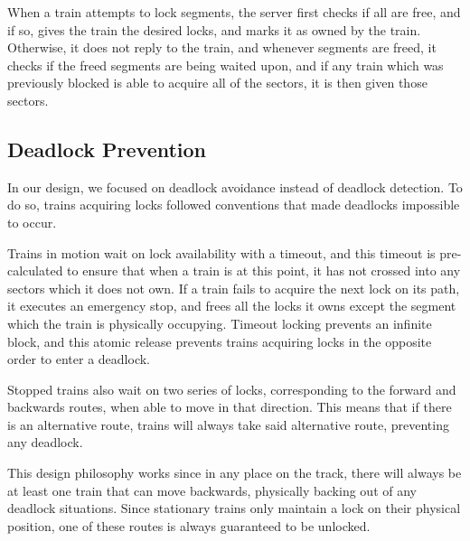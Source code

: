 \documentclass[12pt, titlepage]{article}
\begin{document}
    When a train attempts to lock segments, the server first checks if all are free, and if so, gives the train the desired locks, and marks it as owned by the train. Otherwise, it does not reply to the train, and whenever segments are freed, it checks if the freed segments are being waited upon, and if any train which was previously blocked is able to acquire all of the sectors, it is then given those sectors.

    \subsection{Deadlock Prevention}
    \label{sec:deadlock}
    In our design, we focused on deadlock avoidance instead of deadlock detection. To do so, trains acquiring locks followed conventions that made deadlocks impossible to occur.
    
    Trains in motion wait on lock availability with a timeout, and this timeout is pre-calculated to ensure that when a train is at this point, it has not crossed into any sectors which it does not own. If a train fails to acquire the next lock on its path, it executes an emergency stop, and frees all the locks it owns except the segment which the train is physically occupying. Timeout locking prevents an infinite block, and this atomic release prevents trains acquiring locks in the opposite order to enter a deadlock.
    
    Stopped trains also wait on two series of locks, corresponding to the forward and backwards routes, when able to move in that direction. This means that if there is an alternative route, trains will always take said alternative route, preventing any deadlock.
    
    This design philosophy works since in any place on the track, there will always be at least one train that can move backwards, physically backing out of any deadlock situations. Since stationary trains only maintain a lock on their physical position, one of these routes is always guaranteed to be unlocked.
\end{document}
